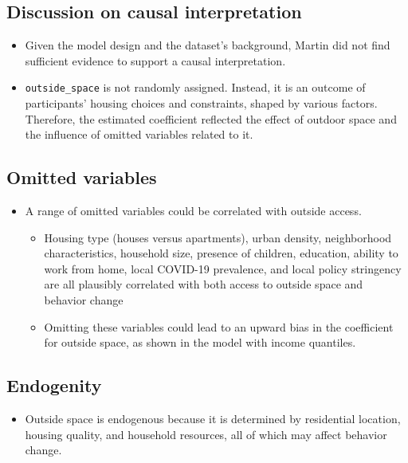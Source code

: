 \documentclass[
  letterpaper,
  DIV=11,
  numbers=noendperiod]{scrartcl}
\providecommand{\tightlist}{%
  \setlength{\itemsep}{0pt}\setlength{\parskip}{0pt}}
\begin{document}
\subsection{Discussion on causal
interpretation}\label{discussion-on-causal-interpretation}

\begin{itemize}
\item
  Given the model design and the dataset's background, Martin did not
  find sufficient evidence to support a causal interpretation.
\item
  \texttt{outside\_space} is not randomly assigned. Instead, it is an
  outcome of participants' housing choices and constraints, shaped by
  various factors. Therefore, the estimated coefficient reflected the
  effect of outdoor space and the influence of omitted variables related
  to it.
\end{itemize}

\subsection{Omitted variables}\label{omitted-variables}

\begin{itemize}
\item
  A range of omitted variables could be correlated with outside access.

  \begin{itemize}
  \item
    Housing type (houses versus apartments), urban density, neighborhood
    characteristics, household size, presence of children, education,
    ability to work from home, local COVID-19 prevalence, and local
    policy stringency are all plausibly correlated with both access to
    outside space and behavior change
  \item
    Omitting these variables could lead to an upward bias in the
    coefficient for outside space, as shown in the model with income
    quantiles.
  \end{itemize}
\end{itemize}

\subsection{Endogenity}\label{endogenity}

\begin{itemize}
\tightlist
\item
  Outside space is endogenous because it is determined by residential
  location, housing quality, and household resources, all of which may
  affect behavior change.
\end{itemize}
\end{document}
